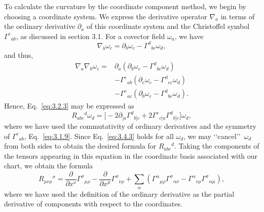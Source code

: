 To calculate the curvature by the coordinate component method, we begin by
choosing a coordinate system. We express the derivative operator $\nabla_a$ in terms of the
ordinary derivative $\partial_a$ of this coordinate system and the Christoffel symbol $\Gamma^c{}_{ab}$, as
discussed in section 3.1. For a covector field $\omega_a$, we have
\begin{equation}
  \nabla_b\omega_c=\partial_b\omega_c-\Gamma^d{}_{bc}\omega_d,
  \tag{3.4.1}\label{eq:3.4.1}
\end{equation}
and thus,
\begin{equation}
  \begin{aligned}
    \nabla_a\nabla_b\omega_c
    ={}&\partial_a(\partial_b\omega_c-\Gamma^d{}_{bc}\omega_d)\\
    &-\Gamma^e{}_{ab}(\partial_e\omega_c-\Gamma^d{}_{ec}\omega_d)\\
    &-\Gamma^e{}_{ac}(\partial_b\omega_e-\Gamma^d{}_{be}\omega_d).
  \end{aligned}
  \tag{3.4.2}\label{eq:3.4.2}
\end{equation}
Hence, Eq.~\eqref{eq:3.2.3} may be expressed as
\begin{equation}
  R_{abc}{}^d\omega_d
  =\bigl[-2\partial_{[a}\Gamma^d{}_{b]c}
  +2\Gamma^e{}_{c[a}\Gamma^d{}_{b]e}\bigr]\omega_d,
  \tag{3.4.3}\label{eq:3.4.3}
\end{equation}
where we have used the commutativity of ordinary derivatives and the symmetry
of $\Gamma^c{}_{ab}$, Eq.~\eqref{eq:3.1.9}. Since Eq.~\eqref{eq:3.4.3} holds for all $\omega_d$, we may
\lq\lq cancel\rq\rq\ $\omega_d$ from both sides to obtain the desired formula for $R_{abc}{}^d$. Taking the components
of the tensors appearing in this equation in the coordinate basis associated with our
chart, we obtain the formula
\begin{equation}
  R_{\mu\nu\rho}{}^\sigma
  =\frac{\partial}{\partial x^\nu}\Gamma^\sigma{}_{\mu\rho}
  -\frac{\partial}{\partial x^\mu}\Gamma^\sigma{}_{\nu\rho}
  +\sum_\alpha\left(\Gamma^\alpha{}_{\mu\rho}\Gamma^\sigma{}_{\alpha\nu}
  -\Gamma^\alpha{}_{\nu\rho}\Gamma^\sigma{}_{\alpha\mu}\right),
  \tag{3.4.4}\label{eq:3.4.4}
\end{equation}
where we have used the definition of the ordinary derivative as the partial derivative
of components with respect to the coordinates.

